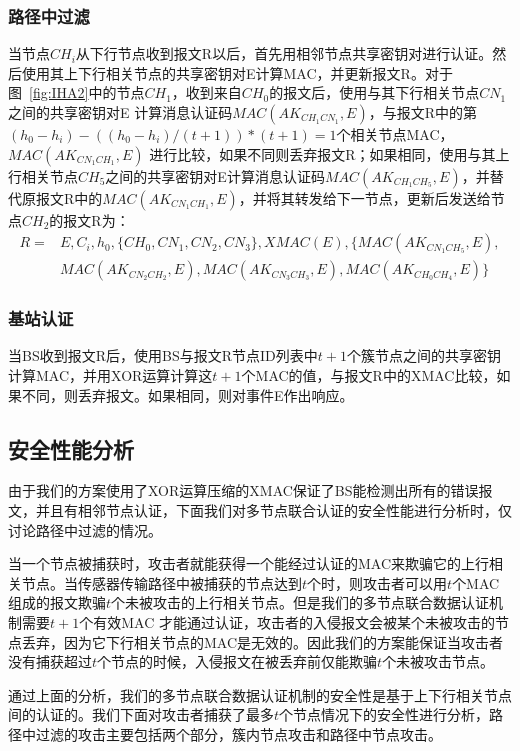 \subsubsection{路径中过滤}
当节点$CH_i$从下行节点收到报文R以后，首先用相邻节点共享密钥对进行认证。然后使用其上下行相关节点的共享密钥对E计算MAC，并更新报文R。对于图~\ref{fig:IHA2}中的节点$CH_1$，收到来自$CH_0$的报文后，使用与其下行相关节点$CN_1$之间的共享密钥对E 计算消息认证码$MAC(AK_{CH_1 CN_1},E)$，与报文R中的第$(h_0 - h_i)-((h_0 - h_i)/(t+1))\ast (t+1)=1$个相关节点MAC，$MAC(AK_{CN_1 CH_1},E)$ 进行比较，如果不同则丢弃报文R；如果相同，使用与其上行相关节点$CH_5$之间的共享密钥对E计算消息认证码$MAC(AK_{CH_1 CH_5},E)$，并替代原报文R中的$MAC(AK_{CN_1 CH_1},E)$，并将其转发给下一节点，更新后发送给节点$CH_2$的报文R为：
\begin{equation}\label{report}
\begin{split}
  R=
  & E,C_i,h_0,\{CH_0,CN_1,CN_2,CN_3\},XMAC(E),\{MAC(AK_{CN_1 CH_5},E),\\
  & MAC(AK_{CN_2 CH_2},E),MAC(AK_{CN_3 CH_3},E),MAC(AK_{CH_0 CH_4},E)\}
\end{split}
\end{equation}
\subsubsection{基站认证}
当BS收到报文R后，使用BS与报文R节点ID列表中$t+1$个簇节点之间的共享密钥计算MAC，并用XOR运算计算这$t+1$个MAC的值，与报文R中的XMAC比较，如果不同，则丢弃报文。如果相同，则对事件E作出响应。
\subsection{安全性能分析}
由于我们的方案使用了XOR运算压缩的XMAC保证了BS能检测出所有的错误报文，并且有相邻节点认证，下面我们对多节点联合认证的安全性能进行分析时，仅讨论路径中过滤的情况。

当一个节点被捕获时，攻击者就能获得一个能经过认证的MAC来欺骗它的上行相关节点。当传感器传输路径中被捕获的节点达到$t$个时，则攻击者可以用$t$个MAC组成的报文欺骗$t$个未被攻击的上行相关节点。但是我们的多节点联合数据认证机制需要$t+1$个有效MAC 才能通过认证，攻击者的入侵报文会被某个未被攻击的节点丢弃，因为它下行相关节点的MAC是无效的。因此我们的方案能保证当攻击者没有捕获超过$t$个节点的时候，入侵报文在被丢弃前仅能欺骗$t$个未被攻击节点。

通过上面的分析，我们的多节点联合数据认证机制的安全性是基于上下行相关节点间的认证的。我们下面对攻击者捕获了最多$t$个节点情况下的安全性进行分析，路径中过滤的攻击主要包括两个部分，簇内节点攻击和路径中节点攻击。
